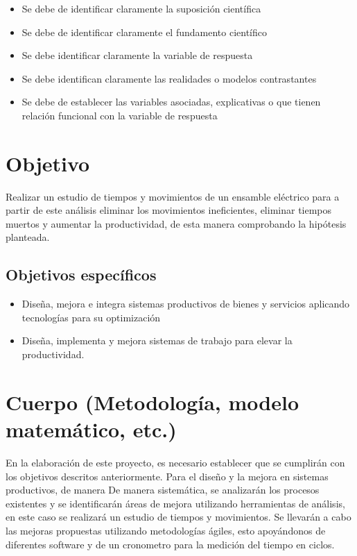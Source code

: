 \begin{itemize}
    \item Se debe de identificar claramente la suposición científica
    \item Se debe de identificar claramente el fundamento científico
    \item Se debe identificar claramente la variable de respuesta
    \item Se debe identifican claramente las realidades o modelos contrastantes
    \item Se debe de establecer las variables asociadas, explicativas o que tienen relación funcional con la variable de respuesta
\end{itemize}
% 
% 
\section{Objetivo}

Realizar un estudio de tiempos y movimientos de un ensamble eléctrico para a partir de este análisis eliminar los movimientos ineficientes, eliminar tiempos muertos y aumentar la productividad, de esta manera comprobando la hipótesis planteada.


\subsection{Objetivos específicos }

\begin{itemize}
    \item Diseña, mejora e integra sistemas productivos de bienes y servicios aplicando tecnologías para su optimización
    \item Diseña, implementa y mejora sistemas de trabajo para elevar la productividad.
\end{itemize}


% 
\section{Cuerpo (Metodología, modelo matemático, etc.)}




En la elaboración de este proyecto, es necesario establecer que se cumplirán con los objetivos descritos anteriormente. Para el diseño y la mejora en sistemas productivos, de manera De manera sistemática, se analizarán los procesos existentes y se identificarán áreas de mejora utilizando herramientas de análisis, en este caso se realizará un estudio de tiempos y movimientos. Se llevarán a cabo las mejoras propuestas utilizando metodologías ágiles, esto apoyándonos de diferentes software y de un cronometro para la medición del tiempo en ciclos.


